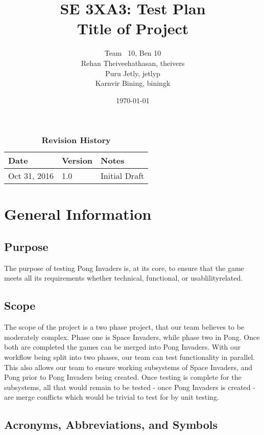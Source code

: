 \documentclass[12pt, titlepage]{article}
\title{SE 3XA3: Test Plan\\Title of Project}
\author{Team \ 10, Ben 10
		\\ Rehan Theiveehathasan, theivers
		\\ Puru Jetly, jetlyp
		\\ Karnvir Bining, biningk
}
\date{\today}
\begin{document}
\maketitle

\tableofcontents
\listoftables
\listoffigures

\begin{table}[bp]
\caption{\bf Revision History}
\begin{tabularx}{\textwidth}{p{3cm}p{2cm}X}
\toprule {\bf Date} & {\bf Version} & {\bf Notes}\\
\midrule
Oct 31, 2016 & 1.0 &  Initial Draft\\
\bottomrule
\end{tabularx}
\end{table}

\newpage


\section{General Information}

\subsection{Purpose}
The purpose of testing Pong Invaders is, at its core, to ensure that
the game meets all its requirements whether technical, functional, or
usablilityrelated.


\subsection{Scope}
The scope of the project is a two phase project, that our team
believes to be moderately complex. Phase one is Space Invaders, while phase two
in Pong. Once both are completed the games can be merged into Pong Invaders.
With our workflow being split into two phases, our team can test functionality
in parallel. This also allows our team to ensure working subsystems of Space
Invaders, and Pong prior to Pong Invaders being created. Once testing is
complete for the subsystems, all that would remain to be tested - once Pong
Invaders is created - are merge conflicts which would be trivial to test for by
unit testing.

\subsection{Acronyms, Abbreviations, and Symbols}
	
\end{document}

